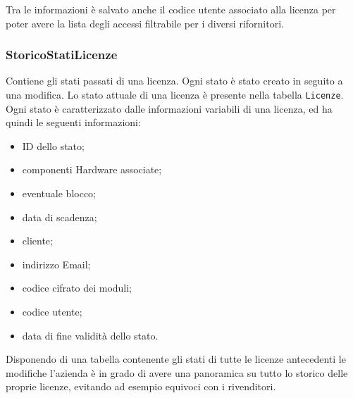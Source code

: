 Tra le informazioni è salvato anche il codice utente associato alla licenza per poter avere la lista degli accessi filtrabile per i diversi rifornitori.

\subsubsection{StoricoStatiLicenze}

Contiene gli stati passati di una licenza. Ogni stato è stato creato in seguito a una modifica. Lo stato attuale di una licenza è presente nella tabella \texttt{Licenze}.
\\Ogni stato è caratterizzato dalle informazioni variabili di una licenza, ed ha quindi le seguenti informazioni:

\begin{itemize}
\item ID dello stato;
\item componenti Hardware associate;
\item eventuale blocco;
\item data di scadenza;
\item cliente;
\item indirizzo Email;
\item codice cifrato dei moduli;
\item codice utente;
\item data di fine validità dello stato.
\end{itemize}

Disponendo di una tabella contenente gli stati di tutte le licenze antecedenti le modifiche l'azienda è in grado di avere una panoramica su tutto lo storico delle proprie licenze, evitando ad esempio equivoci con i rivenditori.